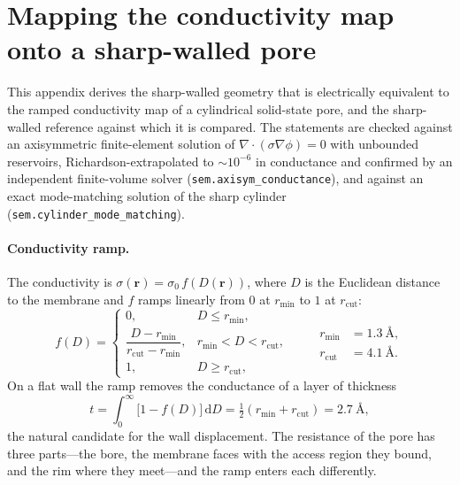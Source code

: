 \section{Mapping the conductivity map onto a sharp-walled pore}\label{app:sigma}
This appendix derives the sharp-walled geometry that is electrically equivalent to the ramped conductivity map of a cylindrical solid-state pore, and the sharp-walled reference against which it is compared. The statements are checked against an axisymmetric finite-element solution of $\nabla\!\cdot\!(\sigma\nabla\phi) = 0$ with unbounded reservoirs, Richardson-extrapolated to $\sim\!10^{-6}$ in conductance and confirmed by an independent finite-volume solver (\texttt{sem.axisym\_conductance}), and against an exact mode-matching solution of the sharp cylinder (\texttt{sem.cylinder\_mode\_matching}).

\paragraph{Conductivity ramp.}
The conductivity is $\sigma(\mathbf{r}) = \sigma_0\,f(D(\mathbf{r}))$, where $D$ is the Euclidean distance to the membrane and $f$ ramps linearly from $0$ at $r_\mathrm{min}$ to $1$ at $r_\mathrm{cut}$:
\begin{equation}
f(D) =
\begin{cases}
0, & D \le r_\mathrm{min},\\[2pt]
\dfrac{D - r_\mathrm{min}}{r_\mathrm{cut} - r_\mathrm{min}}, & r_\mathrm{min} < D < r_\mathrm{cut},\\[8pt]
1, & D \ge r_\mathrm{cut},
\end{cases}
\qquad
\begin{aligned}
r_\mathrm{min} &= 1.3~\text{\AA},\\
r_\mathrm{cut} &= 4.1~\text{\AA}.
\end{aligned}
\label{eq:framp}
\end{equation}
On a flat wall the ramp removes the conductance of a layer of thickness
\begin{equation}
t = \int_0^\infty \bigl[1 - f(D)\bigr]\,\mathrm{d}D = \tfrac{1}{2}(r_\mathrm{min}+r_\mathrm{cut}) = 2.7~\text{\AA},
\label{eq:deficit_t}
\end{equation}
the natural candidate for the wall displacement. The resistance of the pore has three parts---the bore, the membrane faces with the access region they bound, and the rim where they meet---and the ramp enters each differently.

